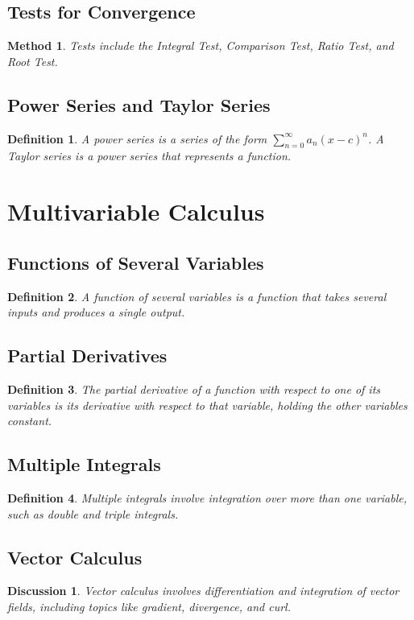 \documentclass[a4paper,12pt]{book}
\newtheorem{definition}{Definition}
\newtheorem{method}{Method}
\newtheorem{discussion}{Discussion}
\begin{document}
\subsection{Tests for Convergence}
\begin{method}
Tests include the Integral Test, Comparison Test, Ratio Test, and Root Test.
\end{method}

\subsection{Power Series and Taylor Series}
\begin{definition}
A power series is a series of the form \( \sum_{n=0}^\infty a_n (x - c)^n \). A Taylor series is a power series that represents a function.
\end{definition}

\section{Multivariable Calculus}
\subsection{Functions of Several Variables}
\begin{definition}
A function of several variables is a function that takes several inputs and produces a single output.
\end{definition}

\subsection{Partial Derivatives}
\begin{definition}
The partial derivative of a function with respect to one of its variables is its derivative with respect to that variable, holding the other variables constant.
\end{definition}

\subsection{Multiple Integrals}
\begin{definition}
Multiple integrals involve integration over more than one variable, such as double and triple integrals.
\end{definition}

\subsection{Vector Calculus}
\begin{discussion}
Vector calculus involves differentiation and integration of vector fields, including topics like gradient, divergence, and curl.
\end{discussion}
\end{document}
